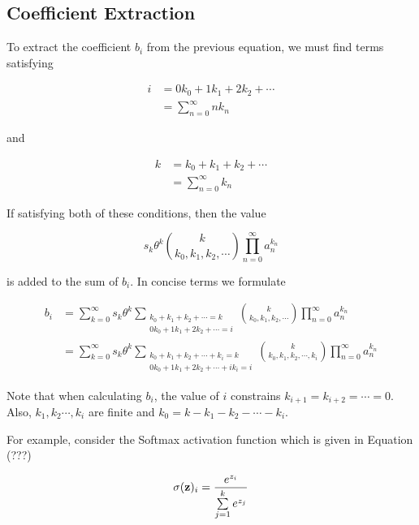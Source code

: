 \subsection{Coefficient Extraction}

To extract the coefficient $b_i$ from the previous equation, we must find terms satisfying 

\begin{align*}
    i
    &= 0 k_0 + 1 k_1 + 2 k_2 + \cdots \\
    &= \sum_{n=0}^{\infty} n k_n
\end{align*}

and

\begin{align*}
    k
    &= k_0 + k_1 + k_2 + \cdots \\
    &= \sum_{n=0}^{\infty} k_n
\end{align*}

If satisfying both of these conditions, then the value

\begin{equation*}
    s_k \theta^k \binom{k}{k_0, k_1, k_2, \cdots} \prod_{n=0}^{\infty} a_n^{k_n}
\end{equation*}

is added to the sum of $b_i$. In concise terms we formulate

\begin{align*}
    b_i
    &= \sum_{k=0}^{\infty} s_k \theta^k \sum_{\substack{k_0 + k_1 + k_2 + \cdots = k \\ 0 k_0 + 1 k_1 + 2 k_2 + \cdots = i}} \binom{k}{k_0, k_1, k_2, \cdots} \prod_{n=0}^{\infty} a_n^{k_n} \\
    &= \sum_{k=0}^{\infty} s_k \theta^k \sum_{\substack{k_0 + k_1 + k_2 + \cdots + k_i = k \\ 0 k_0 + 1 k_1 + 2 k_2 + \cdots + i k_i = i}} \binom{k}{k_0, k_1, k_2, \cdots, k_i} \prod_{n=0}^{\infty} a_n^{k_n} 
\end{align*}

Note that when calculating $b_i$, the value of $i$ constrains $k_{i+1} = k_{i+2} = \cdots = 0$. Also, $k_1, k_2 \cdots, k_i$ are finite and $k_0 = k - k_1 - k_2 - \cdots - k_i$.

For example, consider the Softmax activation function which is given in Equation (???)

\begin{equation}
	\sigma(\bold z)_i =
	\frac{e^{z_i}}{\sum\limits_{j=1}^k e^{z_j}}
\end{equation}

